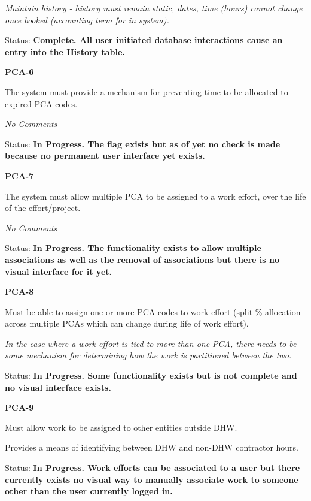 \documentclass{article}
\begin{document}
\noindent \textit{Maintain history - history must remain static, dates, time (hours) cannot change once booked (accounting term for in system).}

\noindent Status: \textbf{Complete.  All user initiated database interactions cause an entry into the History table.}

\noindent \textit{}


\noindent \textbf{PCA-6}

\noindent The system must provide a mechanism for preventing time to be allocated to expired PCA codes.

\textit{No Comments}

\noindent Status: \textbf{In Progress.  The flag exists but as of yet no check is made because no permanent user interface yet exists.}

\noindent \textit{}


\noindent \textbf{PCA-7}

\noindent The system must allow multiple PCA to be assigned to a work effort, over the life of the effort/project.

\textit{No Comments}

\noindent Status: \textbf{In Progress.  The functionality exists to allow multiple associations as well as the removal of associations but there is no visual interface for it yet.}

\noindent \textit{}


\noindent \textbf{PCA-8}

\noindent Must be able to assign one or more PCA codes to work effort (split \% allocation across multiple PCAs which can change during life of work effort).

\noindent \textit{In the case where a work effort is tied to more than one PCA, there needs to be some mechanism for determining how the work is partitioned between the two.}

\noindent Status: \textbf{In Progress.  Some functionality exists but is not complete and no visual interface exists.}

\noindent \textit{}


\noindent \textbf{PCA-9}

\noindent Must allow work to be assigned to other entities outside DHW.

Provides a means of identifying between DHW and non-DHW contractor hours.

\noindent Status: \textbf{In Progress.   Work efforts can be associated to a user but there currently exists no visual way to manually associate work to someone other than the user currently logged in.}
\end{document}
